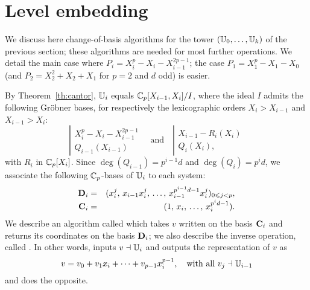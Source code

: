 \section{Level embedding}\label{sec:level-embedding}


We discuss here change-of-basis algorithms for the tower $(\mathbb{U}_0,
\ldots, \mathbb{U}_k)$ of the previous section; these algorithms are needed
for most further operations. We detail the main case where $P_i =
X_i^p - X_i - X_{i-1}^{2p-1}$; the case $P_1= X_1^p - X_1 - X_0$ (and
$P_2=X_2^2+X_2+X_1$ for $p=2$ and $d$ odd) is easier.

By Theorem~\ref{th:cantor}, $\mathbb{U}_i$ equals $\mathbb{C}_p[X_{i-1},X_i]/I$, where
the ideal $I$ admits the following Gr{\"o}bner bases, for respectively
the lexicographic orders $X_i>X_{i-1}$ and $X_{i-1}>X_i$:
\begin{equation*}
  \left |
  \begin{array}{rl}
    X_i^p - X_i - X_{i-1}^{2p-1} \\
    Q_{i-1}(X_{i-1})         
  \end{array}
\right.
  \quad \text{and}\quad
  \left |
  \begin{array}{rl}
    X_{i-1} - R_i(X_i) \\
    Q_i(X_i),
  \end{array}
\right.
\end{equation*}
with $R_i$ in $\mathbb{C}_p[X_i]$. Since $\deg(Q_{i-1})=p^{i-1}d$ and
$\deg(Q_{i})=p^id$, we associate the following $\mathbb{C}_p$-bases of $\mathbb{U}_i$
to each system:
\begin{eqnarray}
{\bf D}_i&   =   &(x_i^j,\,x_{i-1}x_i^j,\,\ldots,\,x_{i-1}^{p^{i-1}d-1}x_i^j)_{0 \leqslant j < p},\notag\\[-1mm]
\mathbf{C}_i&   =   &(1,\,x_i,\,\ldots,\,x_i^{p^id-1}).  \label{eq:bases}
\end{eqnarray}
We describe an algorithm called  which takes $v$
written on the basis $\mathbf{C}_i$ and returns its coordinates on the basis
${\bf D}_i$; we also describe the inverse operation, called . 
In other words,  inputs $v\dashv\mathbb{U}_i$ and outputs the
representation of $v$ as
\begin{equation}
  \label{eq:vectorspace}
  v = v_0 + v_1x_i + \cdots + v_{p-1}x_i^{p-1}, \quad\text{with all~} v_j \dashv \mathbb{U}_{i-1}
\end{equation}
and  does the opposite.

